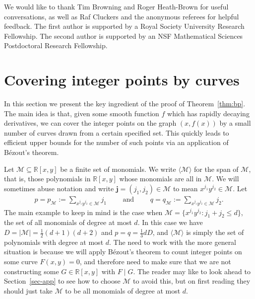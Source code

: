 \documentclass[12pt]{amsart}
\newcommand{\1}{{\mathbf 1}}
\theoremstyle{remark}
\theoremstyle{definition}
\begin{document}
We would like to thank Tim Browning and Roger Heath-Brown for useful conversations, as well as Raf Cluckers and the anonymous referees for helpful feedback. The first author is supported by a Royal Society University Research Fellowship. The second author is supported by an NSF Mathematical Sciences Postdoctoral Research Fellowship.

\section{Covering integer points by curves}
In this section we present the key ingredient of the proof of Theorem~\ref{thm:bp}. The main idea is that, given some smooth function $f$ which has rapidly decaying derivatives, we can cover the integer points on the graph $(x,f(x))$ by a small number of curves drawn from a certain specified set. This quickly leads to efficient upper bounds for the number of such points via an application of B\'ezout's theorem.

Let $\mathcal{M}\subseteq \mathbb{R}[x,y]$ be a finite set of monomials. We write $\langle \mathcal{M}\rangle$ for the span of $\mathcal{M}$, that is, those polynomials in $\mathbb{R}[x,y]$ whose monomials are all in $\mathcal{M}$. We will sometimes abuse notation and write $\mathbf{j}=(j_1,j_2)\in \mathcal{M}$ to mean $x^{j_1}y^{j_2}\in \mathcal{M}$. Let 
\begin{align}\label{def:pq}
p=p_{\mathcal{M}}:=\sum_{x^{j_1}y^{j_2}\in \mathcal{M}}j_1\qquad\text{ and }\qquad
q=q_{\mathcal{M}}:=\sum_{x^{j_1}y^{j_2}\in \mathcal{M}}j_2.
\end{align}
The main example to keep in mind is the case when $\mathcal M = \{x^{j_1}y^{j_2} : j_1+j_2 \le d\}$, the set of all monomials of degree at most $d$. In this case we have
$D = |\mathcal M| %
= \frac{1}{2}(d+1)(d+2)$
and
$p=q %
= \frac{1}{3}dD$, and $\langle \mathcal{M}\rangle$ is simply the set of polynomials with degree at most $d$. The need to work with the more general situation is because we will apply B\'ezout's theorem to count integer points on some curve $F(x,y)=0$, and therefore need to make sure that we are not constructing some $G\in \mathbb{R}[x,y]$ with $F\mid G$. The reader may like to look ahead to Section~\ref{sec-app} to see how to choose $\mathcal{M}$ to avoid this, but on first reading they should just take $\mathcal{M}$ to be all monomials of degree at most $d$.
\end{document}
